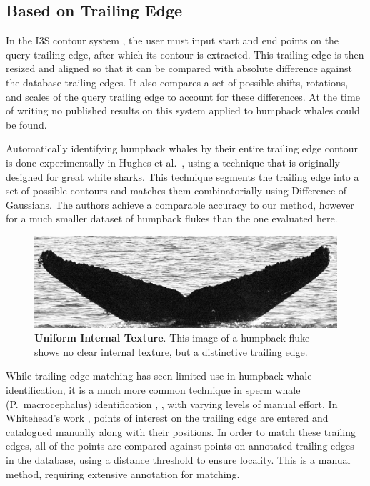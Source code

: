 \subsection{Based on Trailing Edge}

In the I3S contour system \cite{i3scontour}, the user must input start and end points on the query trailing edge, after which its contour is extracted.
This trailing edge is then resized and aligned so that it can be compared with absolute difference against the database trailing edges.
It also compares a set of possible shifts, rotations, and scales of the query trailing edge to account for these differences.
At the time of writing no published results on this system applied to humpback whales could be found.

Automatically identifying humpback whales by their entire trailing edge contour is done experimentally in Hughes et al.\ \cite{hughes2015automated}, using a technique that is originally designed for great white sharks. 
This technique segments the trailing edge into a set of possible contours and matches them combinatorially using Difference of Gaussians.
The authors achieve a comparable accuracy to our method, however for a much smaller dataset of humpback flukes than the one evaluated here.

\begin{figure}[t]%
\centering
\includegraphics[width=1.0\textwidth]{../images/unclear_texture.jpg}
\caption{\textbf{Uniform Internal Texture}. This image of a humpback fluke shows no clear internal texture, but a distinctive trailing edge.}
\label{fig:unclear_texture}
\end{figure}

While trailing edge matching has seen limited use in humpback whale identification, it is a much more common technique in sperm whale (P.\ macrocephalus) identification \cite{huele2000finding}, \cite{beekmans2005comparison} \cite{whitehead1990computer}, with varying levels of manual effort.
In Whitehead's work \cite{whitehead1990computer}, points of interest on the trailing edge are entered and catalogued manually along with their positions.
In order to match these trailing edges, all of the points are compared against points on annotated trailing edges in the database, using a distance threshold to ensure locality.
This is a manual method, requiring extensive annotation for matching.

